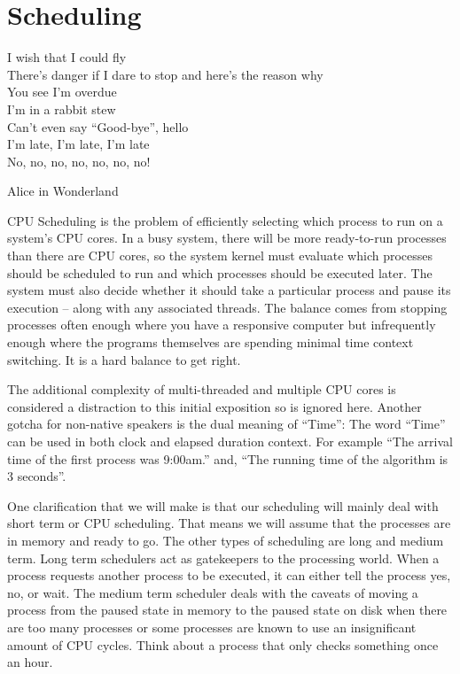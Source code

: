 \chapter{Scheduling}

\epigraph{I wish that I could fly\\
There's danger if I dare to stop and here's the reason why\\
You see I'm overdue\\
I'm in a rabbit stew\\
Can't even say ``Good-bye'', hello\\
I'm late, I'm late, I'm late\\
No, no, no, no, no, no, no!}{Alice in Wonderland}

CPU Scheduling is the problem of efficiently selecting which process to run on a system's CPU cores.
In a busy system, there will be more ready-to-run processes than there are CPU cores, so the system kernel must evaluate which processes should be scheduled to run and which processes should be executed later.
The system must also decide whether it should take a particular process and pause its execution -- along with any associated threads.
The balance comes from stopping processes often enough where you have a responsive computer but infrequently enough where the programs themselves are spending minimal time context switching.
It is a hard balance to get right.

The additional complexity of multi-threaded and multiple CPU cores is considered a distraction to this initial exposition so is ignored here.
Another gotcha for non-native speakers is the dual meaning of ``Time'': The word ``Time'' can be used in both clock and elapsed duration context.
For example ``The arrival time of the first process was 9:00am.'' and, ``The running time of the algorithm is 3 seconds''.

One clarification that we will make is that our scheduling will mainly deal with short term or CPU scheduling.
That means we will assume that the processes are in memory and ready to go.
The other types of scheduling are long and medium term.
Long term schedulers act as gatekeepers to the processing world.
When a process requests another process to be executed, it can either tell the process yes, no, or wait.
The medium term scheduler deals with the caveats of moving a process from the paused state in memory to the paused state on disk when there are too many processes or some processes are known to use an insignificant amount of CPU cycles.
Think about a process that only checks something once an hour.

